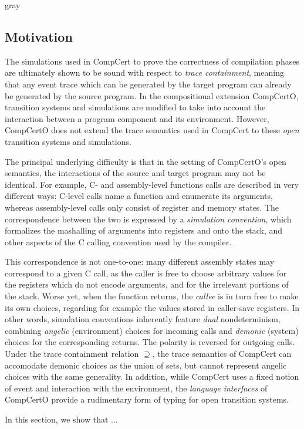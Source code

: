 \documentclass[sigplan,10pt,review,anonymous]{acmart}
\begin{document}
\begin{color}{gray} %

\subsection*{Motivation}

The simulations used in CompCert
to prove the correctness of compilation phases
are ultimately shown to be sound
with respect to \emph{trace containment},
meaning that any event trace which can be generated by the target program
can already be generated by the source program.
In the compositional extension CompCertO,
transition systems and simulations
are modified to take into account
the interaction between a program component and its environment.
However, CompCertO does not extend the trace semantics
used in CompCert to these \emph{open} transition systems and simulations.

The principal underlying difficulty is that
in the setting of CompCertO's open semantics,
the interactions of the source and target program
may not be identical.
For example, C- and assembly-level functions calls
are described in very different ways:
C-level calls name a function and enumerate its arguments,
whereas assembly-level calls only consist of register and memory states.
The correspondence between the two is expressed by
a \emph{simulation convention},
which formalizes the mashalling of arguments
into registers and onto the stack,
and other aspects of the C calling convention used by the compiler.

This correspondence is not one-to-one:
many different assembly states may correspond to a given C call,
as the caller is free to choose arbitrary values
for the registers which do not encode arguments,
and for the irrelevant portions of the stack.
Worse yet,
when the function returns,
the \emph{callee} is in turn free to make its own choices,
regarding for example the values stored in caller-save registers.
In other words,
simulation conventions inherently feature \emph{dual} nondeterminism,
combining \emph{angelic} (environment) choices for incoming calls
and \emph{demonic} (system) choices for the corresponding returns.
The polarity is reversed for outgoing calls.
Under the trace containment relation $\supseteq$,
the trace semantics of CompCert
can accomodate demonic choices as the union of sets,
but cannot represent angelic choices with the same generality.
In addition,
while CompCert uses a fixed notion of
event and interaction with the environment,
the \emph{language interfaces} of CompCertO
provide a rudimentary form of typing
for open transition systems.

In this section,
we show that ...

\end{color}
\end{document}

